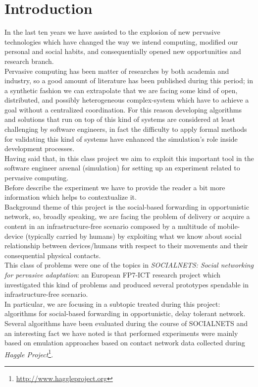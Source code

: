 \section{Introduction}
\label{intro}

In the last ten years we have assisted to the explosion of new pervasive technologies which have changed the way we intend computing, modified our personal and social habits, and consequentially opened new opportunities and research branch.\\
Pervasive computing has been matter of researches by both academia and industry, so a good amount of literature has been published during this period; in a synthetic fashion we can extrapolate that we are facing some kind of open, distributed, and possibly heterogeneous complex-system which have to achieve a goal without a centralized coordination. For this reason developing algorithms and solutions that run on top of this kind of systems are considered at least challenging by software engineers, in fact the difficulty to apply formal methods for validating this kind of systems have enhanced the simulation's role inside development processes. \\
Having said that, in this class project we aim to exploit this important tool in the software engineer arsenal (simulation) for setting up an experiment related to pervasive computing.\\
Before describe the experiment we have to provide the reader a bit more information which helps to contextualize it. \\
Background theme of this project is the social-based forwarding in opportunistic network, so, broadly speaking, we are facing the problem of delivery or acquire a content in an infrastructure-free scenario composed by a multitude of mobile-device (typically carried by humans) by exploiting what we know about social relationship between devices/humans with respect to their movements and their consequential physical contacts. \\
This class of problems were one of the topics in \emph{SOCIALNETS: Social networking for pervasive adaptation}\cite{socialnetseu}: an European FP7-ICT research project which investigated this kind of problems and produced several prototypes spendable in infrastructure-free scenario. \\
In particular, we are focusing in a subtopic treated during this project: algorithms for social-based forwarding in opportunistic, delay tolerant network. \\
Several algorithms have been evaluated during the course of SOCIALNETS and an interesting fact we have noted is that performed experiments were mainly based on emulation approaches\cite{bubble} based on contact network data collected during \emph{Haggle Project}\footnote{\url{http://www.haggleproject.org}}.\\
